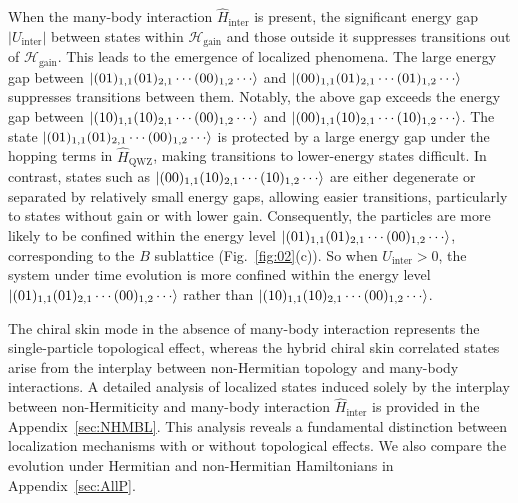 \documentclass[longbibliography, aps, prx, amsmath, amssymb, amsfonts, twocolumn,superscriptaddress, footinbib]{revtex4-1}
\begin{document}
	When the many-body interaction $\hat{H}_{\text{inter}}$ is present, the significant energy gap $\vert U_{\text{inter}} \vert$ between states within $\mathscr{H}_{\text{gain}}$ and those outside it suppresses transitions out of $\mathscr{H}_{\text{gain}}$. This leads to the emergence of localized phenomena. 
	The large energy gap between $\ket{(01)_{1,1}(01)_{2,1}\cdots(00)_{1,2}\cdots}$ and $\ket{(00)_{1,1}(01)_{2,1}\cdots(01)_{1,2}\cdots}$ suppresses transitions between them. 
	Notably, the above gap exceeds the energy gap between $\ket{(10)_{1,1}(10)_{2,1}\cdots(00)_{1,2}\cdots}$ and $\ket{(00)_{1,1}(10)_{2,1}\cdots(10)_{1,2}\cdots}$.
	The state $\ket{(01)_{1,1}(01)_{2,1}\cdots(00)_{1,2}\cdots}$ is protected by a large energy gap under the hopping terms in $\hat{H}_{\text{QWZ}}$, making transitions to lower-energy states difficult. In contrast, states such as $\ket{(00)_{1,1}(10)_{2,1}\cdots(10)_{1,2}\cdots}$ are either degenerate or separated by relatively small energy gaps, allowing easier transitions, particularly to states without gain or with lower gain.
	Consequently, the particles are more likely to be confined within the energy level 
	$\ket{(01)_{1,1}(01)_{2,1}\cdots(00)_{1,2}\cdots}$,
	 corresponding to the $B$ sublattice (Fig.~\ref{fig:02}(c)). 
	So when $U_{\text{inter}}>0$, the system under time evolution 
	is more confined within the energy level 
	$\ket{(01)_{1,1}(01)_{2,1}\cdots(00)_{1,2}\cdots}$ rather than $\ket{(10)_{1,1}(10)_{2,1}\cdots(00)_{1,2}\cdots}$.

	The chiral skin mode in the absence of many-body interaction represents the single-particle topological effect, whereas the hybrid chiral skin correlated states arise from the interplay between non-Hermitian topology and many-body interactions. A detailed analysis of localized states induced solely by the interplay between non-Hermiticity and many-body interaction $\hat{H}_{\text{inter}}$ is provided in the Appendix~\ref{sec:NHMBL}.
	This analysis reveals a fundamental distinction between localization mechanisms with or without topological effects.
	We also compare the evolution under Hermitian and non-Hermitian Hamiltonians in Appendix~\ref{sec:AllP}.
\end{document}
